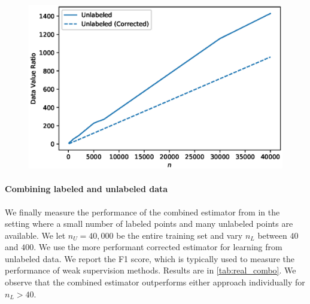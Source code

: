 \begin{figure}
    \centering
    \includegraphics[width=.4\textwidth]{eps_figures/real_data_value_ratio.eps}
    \caption{}
    \label{fig:real_data_value_ratio}
\end{figure}

\paragraph{Combining labeled and unlabeled data} We finally measure the performance of the combined estimator from \cite{GreenStrawderman2001} in the setting where a small number of labeled points and many unlabeled points are available. We let $n_U=40,000$ be the entire training set and vary $n_L$ between $40$ and $400$. We use the more performant corrected estimator for learning from unlabeled data. We report the F1 score, which is typically used to measure the performance of weak supervision methods. Results are in \autoref{tab:real_combo}. We observe that the combined estimator outperforms either approach individually for $n_L>40$.



